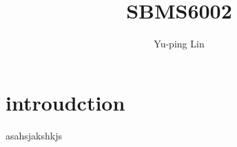 \documentclass{article}
\begin{document}
\title{SBMS6002}
\author{Yu-ping Lin}
\maketitle

\section{introudction}

asahsjakshkjs \cite{so2011evaluating}



\end{document}
